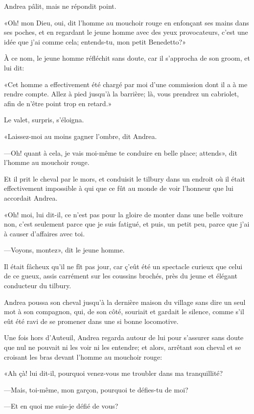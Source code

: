 Andrea pâlit, mais ne répondit point.  

«Oh! mon Dieu, oui, dit l'homme au mouchoir rouge en enfonçant ses mains dans ses poches, et en regardant le jeune homme avec des yeux provocateurs, c'est une idée que j'ai comme cela; entends-tu, mon petit Benedetto?» 

À ce nom, le jeune homme réfléchit sans doute, car il s'approcha de son groom, et lui dit: 

«Cet homme a effectivement été chargé par moi d'une commission dont il a à me rendre compte. Allez à pied jusqu'à la barrière; là, vous prendrez un cabriolet, afin de n'être point trop en retard.» 

Le valet, surpris, s'éloigna. 

«Laissez-moi au moins gagner l'ombre, dit Andrea. 

—Oh! quant à cela, je vais moi-même te conduire en belle place; attends», dit l'homme au mouchoir rouge. 

Et il prit le cheval par le mors, et conduisit le tilbury dans un endroit où il était effectivement impossible à qui que ce fût au monde de voir l'honneur que lui accordait Andrea. 

«Oh! moi, lui dit-il, ce n'est pas pour la gloire de monter dans une belle voiture non, c'est seulement parce que je suis fatigué, et puis, un petit peu, parce que j'ai à causer d'affaires avec toi. 

—Voyons, montez», dit le jeune homme. 

Il était fâcheux qu'il ne fît pas jour, car ç'eût été un spectacle curieux que celui de ce gueux, assis carrément sur les coussins brochés, près du jeune et élégant conducteur du tilbury. 

Andrea poussa son cheval jusqu'à la dernière maison du village sans dire un seul mot à son compagnon, qui, de son côté, souriait et gardait le silence, comme s'il eût été ravi de se promener dans une si bonne locomotive. 

Une fois hors d'Auteuil, Andrea regarda autour de lui pour s'assurer sans doute que nul ne pouvait ni les voir ni les entendre; et alors, arrêtant son cheval et se croisant les bras devant l'homme au mouchoir rouge: 

«Ah çà! lui dit-il, pourquoi venez-vous me troubler dans ma tranquillité? 

—Mais, toi-même, mon garçon, pourquoi te défies-tu de moi? 

—Et en quoi me suis-je défié de vous? 

